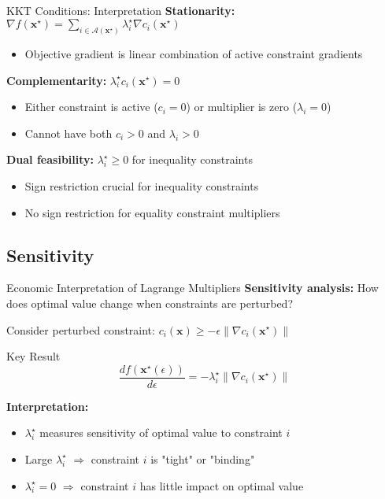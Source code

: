 \documentclass[aspectratio=1610]{beamer}
\begin{document}
\begin{frame}{KKT Conditions: Interpretation}
  \textbf{Stationarity:} $\nabla f(\mathbf{x}^{\star}) = \sum_{i \in \mathcal{A}(\mathbf{x}^{\star})} \lambda_i^{\star} \nabla c_i(\mathbf{x}^{\star})$
  \begin{itemize}
    \item Objective gradient is linear combination of active constraint gradients
  \end{itemize}
  
  \textbf{Complementarity:} $\lambda_i^{\star} c_i(\mathbf{x}^{\star}) = 0$
  \begin{itemize}
    \item Either constraint is active ($c_i = 0$) or multiplier is zero ($\lambda_i = 0$)
    \item Cannot have both $c_i > 0$ and $\lambda_i > 0$
  \end{itemize}
  
  \textbf{Dual feasibility:} $\lambda_i^{\star} \geq 0$ for inequality constraints
  \begin{itemize}
    \item Sign restriction crucial for inequality constraints
    \item No sign restriction for equality constraint multipliers
  \end{itemize}
\end{frame}

\subsection{Sensitivity}
\begin{frame}{Economic Interpretation of Lagrange Multipliers}
  \textbf{Sensitivity analysis:} How does optimal value change when constraints are perturbed?
  
  \vspace{0.3cm}
  Consider perturbed constraint: $c_i(\mathbf{x}) \geq -\epsilon \|\nabla c_i(\mathbf{x}^{\star})\|$
  
  \begin{block}{Key Result}
    $$\frac{df(\mathbf{x}^{\star}(\epsilon))}{d\epsilon} = -\lambda_i^{\star} \|\nabla c_i(\mathbf{x}^{\star})\|$$
  \end{block}
  
  \textbf{Interpretation:}
  \begin{itemize}
    \item $\lambda_i^{\star}$ measures sensitivity of optimal value to constraint $i$
    \item Large $\lambda_i^{\star}$ $\Rightarrow$ constraint $i$ is "tight" or "binding"
    \item $\lambda_i^{\star} = 0$ $\Rightarrow$ constraint $i$ has little impact on optimal value
  \end{itemize}
\end{frame}
\end{document}
